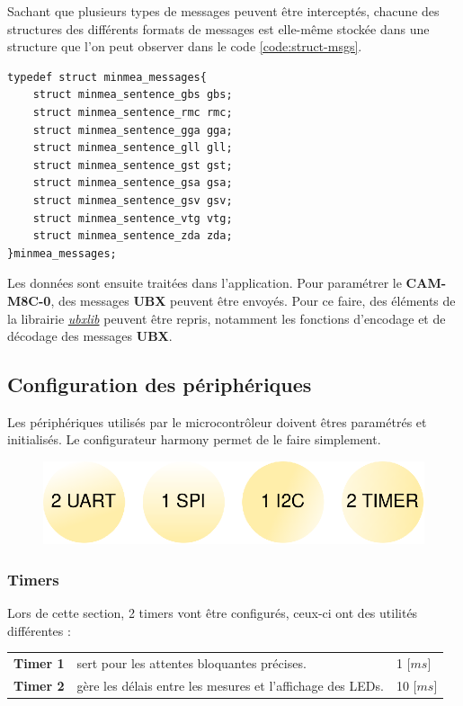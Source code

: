 Sachant que plusieurs types de messages peuvent être interceptés, chacune des structures des différents formats de messages est elle-même stockée dans une structure que l'on peut observer dans le code \ref{code:struct-msgs}.

\begin{code}
\caption{Structures messages.}
\label{code:struct-msgs}
\begin{verbatim}
typedef struct minmea_messages{
	struct minmea_sentence_gbs gbs;
	struct minmea_sentence_rmc rmc;
	struct minmea_sentence_gga gga;
	struct minmea_sentence_gll gll;
	struct minmea_sentence_gst gst;
	struct minmea_sentence_gsa gsa;
	struct minmea_sentence_gsv gsv;
	struct minmea_sentence_vtg vtg;
	struct minmea_sentence_zda zda;
}minmea_messages;
\end{verbatim}
\end{code}

Les données sont ensuite traitées dans l'application. Pour paramétrer le \textbf{CAM-M8C-0}, des messages \textbf{UBX} peuvent être envoyés. Pour ce faire, des éléments de la librairie \href{https://github.com/u-blox/ubxlib}{\textit{ubxlib}} peuvent être repris, notamment les fonctions d'encodage et de décodage des messages \textbf{UBX}.



\subsection{Configuration des périphériques}
Les périphériques utilisés par le microcontrôleur doivent êtres paramétrés et initialisés. Le configurateur \gls{harmony} permet de le faire simplement.

\begin{figure}[h]
	\centering
	\includegraphics[width=.5\linewidth]{../figures/code/périphériques}
\end{figure}

\clearpage

\subsubsection{Timers}
Lors de cette section, 2 timers vont être configurés, ceux-ci ont des utilités différentes :

\begin{table}[h]
\begin{tabular}{lll}
	\textbf{Timer 1} & sert pour les attentes bloquantes précises. & 1 [$ms$] \\
	\textbf{Timer 2} & gère les délais entre les mesures et l'affichage des LEDs. & 10 [$ms$] \\
\end{tabular} 
\end{table} \vspace*{-5pt}


